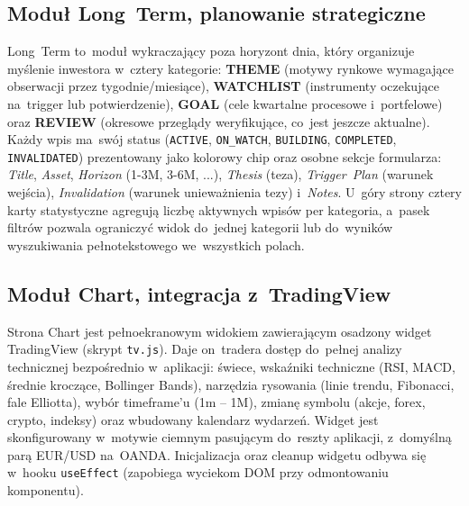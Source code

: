 \documentclass[12pt,a4paper]{article}
\begin{document}
\subsection*{Moduł Long~Term, planowanie strategiczne}
Long~Term to~moduł wykraczający poza horyzont dnia, który organizuje myślenie inwestora w~cztery kategorie: \textbf{THEME} (motywy rynkowe wymagające obserwacji przez tygodnie/miesiące), \textbf{WATCHLIST} (instrumenty oczekujące na~trigger lub potwierdzenie), \textbf{GOAL} (cele kwartalne procesowe i~portfelowe) oraz \textbf{REVIEW} (okresowe przeglądy weryfikujące, co~jest jeszcze aktualne). Każdy wpis ma~swój status (\texttt{ACTIVE}, \texttt{ON\_WATCH}, \texttt{BUILDING}, \texttt{COMPLETED}, \texttt{INVALIDATED}) prezentowany jako kolorowy chip oraz osobne sekcje formularza: \emph{Title}, \emph{Asset}, \emph{Horizon} (1-3M, 3-6M, ...), \emph{Thesis} (teza), \emph{Trigger~Plan} (warunek wejścia), \emph{Invalidation} (warunek unieważnienia tezy) i~\emph{Notes}. U~góry strony cztery karty statystyczne agregują liczbę aktywnych wpisów per kategoria, a~pasek filtrów pozwala ograniczyć widok do~jednej kategorii lub do~wyników wyszukiwania pełnotekstowego we~wszystkich polach.

\subsection*{Moduł Chart, integracja z~TradingView}
Strona Chart jest pełnoekranowym widokiem zawierającym osadzony widget TradingView (skrypt \texttt{tv.js}). Daje on~tradera dostęp do~pełnej analizy technicznej bezpośrednio w~aplikacji: świece, wskaźniki techniczne (RSI, MACD, średnie kroczące, Bollinger Bands), narzędzia rysowania (linie trendu, Fibonacci, fale Elliotta), wybór timeframe'u (1m -- 1M), zmianę symbolu (akcje, forex, crypto, indeksy) oraz wbudowany kalendarz wydarzeń. Widget jest skonfigurowany w~motywie ciemnym pasującym do~reszty aplikacji, z~domyślną parą EUR/USD na~OANDA. Inicjalizacja oraz cleanup widgetu odbywa się w~hooku \texttt{useEffect} (zapobiega wyciekom DOM przy odmontowaniu komponentu).

\end{document}
